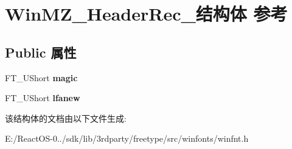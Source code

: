 \hypertarget{struct_win_m_z___header_rec__}{}\section{Win\+M\+Z\+\_\+\+Header\+Rec\+\_\+结构体 参考}
\label{struct_win_m_z___header_rec__}
\subsection*{Public 属性}
\begin{DoxyCompactItemize}
\item 
\mbox{\label{struct_win_m_z___header_rec___a5c88e9ba776cf18831f4ae4e4728e6e9}} 
F\+T\+\_\+\+U\+Short {\bfseries magic}
\item 
\mbox{\label{struct_win_m_z___header_rec___a41ad7b14830b8177bfefb6a0b9e198a1}} 
F\+T\+\_\+\+U\+Short {\bfseries lfanew}
\end{DoxyCompactItemize}


该结构体的文档由以下文件生成\+:\begin{DoxyCompactItemize}
\item 
E\+:/\+React\+O\+S-\/0../sdk/lib/3rdparty/freetype/src/winfonts/winfnt.\+h\end{DoxyCompactItemize}
